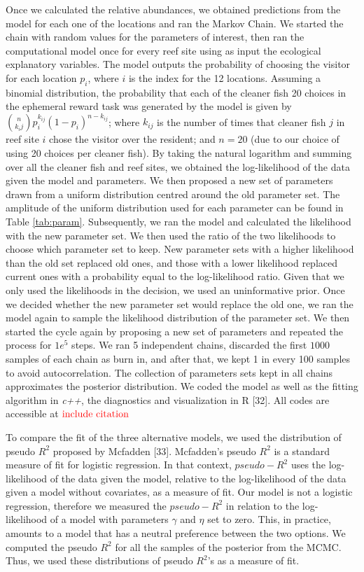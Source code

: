 \documentclass[10pt,letterpaper]{article}
\begin{document}
Once we calculated the relative abundances, we obtained predictions from
the model for each one of the locations and ran the Markov Chain. We
started the chain with random values for the parameters of interest,
then ran the computational model once for every reef site using as input
the ecological explanatory variables. The model outputs the probability
of choosing the visitor for each location \(p_i\), where \(i\) is the
index for the 12 locations. Assuming a binomial distribution, the
probability that each of the cleaner fish 20 choices in the ephemeral
reward task was generated by the model is given by
\(\binom{n}{k_ij}p^{k_{ij}}_i (1-p_i)^{n-k_{ij}}\); where \(k_{ij}\) is
the number of times that cleaner fish \(j\) in reef site \(i\) chose the
visitor over the resident; and \(n=20\) (due to our choice of using 20
choices per cleaner fish). By taking the natural logarithm and summing
over all the cleaner fish and reef sites, we obtained the log-likelihood
of the data given the model and parameters. We then proposed a new set
of parameters drawn from a uniform distribution centred around the old
parameter set. The amplitude of the uniform distribution used for each
parameter can be found in Table \ref{tab:param}. Subsequently, we ran
the model and calculated the likelihood with the new parameter set. We
then used the ratio of the two likelihoods to choose which parameter set
to keep. New parameter sets with a higher likelihood than the old set
replaced old ones, and those with a lower likelihood replaced current
ones with a probability equal to the log-likelihood ratio. Given that we
only used the likelihoods in the decision, we used an uninformative
prior. Once we decided whether the new parameter set would replace the
old one, we ran the model again to sample the likelihood distribution of
the parameter set. We then started the cycle again by proposing a new
set of parameters and repeated the process for \(1e^5\) steps. We ran 5
independent chains, discarded the first \(1000\) samples of each chain
as burn in, and after that, we kept 1 in every 100 samples to avoid
autocorrelation. The collection of parameters sets kept in all chains
approximates the posterior distribution. We coded the model as well as
the fitting algorithm in \emph{c++}, the diagnostics and visualization
in R {[}32{]}. All codes are accessible at
\(\color{red}{\text{include citation}}\)

To compare the fit of the three alternative models, we used the
distribution of pseudo \(R^2\) proposed by Mcfadden {[}33{]}. Mcfadden's
pseudo \(R^2\) is a standard measure of fit for logistic regression. In
that context, \(pseudo-R^2\) uses the log-likelihood of the data given
the model, relative to the log-likelihood of the data given a model
without covariates, as a measure of fit. Our model is not a logistic
regression, therefore we measured the \(pseudo-R^2\) in relation to the
log-likelihood of a model with parameters \(\gamma\) and \(\eta\) set to
zero. This, in practice, amounts to a model that has a neutral
preference between the two options. We computed the pseudo \(R^2\) for
all the samples of the posterior from the MCMC. Thus, we used these
distributions of pseudo \(R^2\)'s as a measure of fit.
\end{document}
